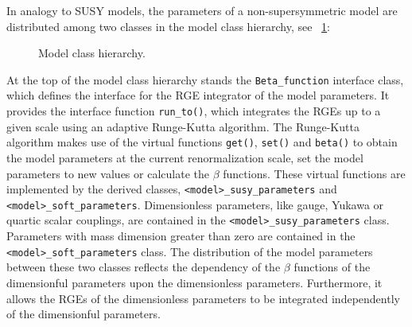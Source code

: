 \documentclass[final,3p,11pt,pdflatex]{elsarticle}
\newcommand{\code}[1]{\lstinline|#1|}  %
\newcommand{\figref}[1]{\figurename~\ref{#1}}
\begin{document}
In analogy to SUSY models, the parameters of a non-supersymmetric
model are distributed among two classes in the model class
hierarchy, see \figref{fig:parameter-classes}:
%
\begin{figure}[tbh]
  \centering
  \caption{Model class hierarchy.}
  \label{fig:parameter-classes}
\end{figure}
%
At the top of the model class hierarchy stands the
\code{Beta_function} interface class, which defines the interface for
the RGE integrator of the model parameters.  It provides the interface
function \code{run_to()}, which integrates the RGEs up to a given
scale using an adaptive Runge-Kutta algorithm.  The Runge-Kutta
algorithm makes use of the virtual functions \code{get()},
\code{set()} and \code{beta()} to obtain the model parameters at the
current renormalization scale, set the model parameters to new values
or calculate the $\beta$ functions.  These virtual functions are
implemented by the derived classes, \code{<model>_susy_parameters} and
\code{<model>_soft_parameters}.  Dimensionless parameters, like
gauge, Yukawa or quartic scalar couplings, are contained in the
\code{<model>_susy_parameters} class.  Parameters with mass dimension
greater than zero are contained in the \code{<model>_soft_parameters}
class.  The distribution of the model parameters between these two
classes reflects the dependency of the
$\beta$ functions of the dimensionful parameters upon the
dimensionless parameters.  Furthermore, it allows
the RGEs of the dimensionless parameters to be integrated independently of the
dimensionful parameters.
\end{document}
